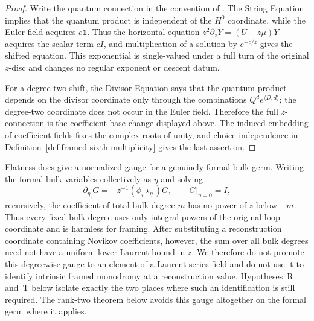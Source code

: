 \begin{proof}
Write the quantum connection in the convention of
\cite[(2.2)--(2.3) and Remark~2.3]{IritaniBlowup}.  The String Equation
implies that the quantum product is independent of the $H^0$ coordinate,
while the Euler field acquires $c\mathbf1$.  Thus the horizontal equation
$z^2\partial_zY=(U-z\mu)Y$ acquires the scalar term $cI$, and multiplication
of a solution by $e^{-c/z}$ gives the shifted equation.  This exponential is
single-valued under a full turn of the original $z$-disc and changes no
regular exponent or descent datum.

For a degree-two shift, the Divisor Equation says that the quantum product
depends on the divisor coordinate only through the combinations
$Q^d e^{\langle D,d\rangle}$; the degree-two coordinate does not occur in
the Euler field.  Therefore the full $z$-connection is the coefficient
base change displayed above.  The induced embedding of coefficient fields
fixes the complex roots of unity, and choice independence in
Definition~\ref{def:framed-sixth-multiplicity} gives the last assertion.
\end{proof}

\begin{remark}
\label{rem:residual-bulk-gap}
Flatness does give a normalized gauge for a genuinely formal bulk germ.
Writing the formal bulk variables collectively as $\eta$ and solving
\[
 \partial_{\eta_i}G=-z^{-1}(\phi_i\star_\eta)G,
 \qquad G|_{\eta=0}=I,
\]
recursively, the coefficient of total bulk degree $m$ has no power of $z$
below $-m$.  Thus every fixed bulk degree uses only integral powers of the
original loop coordinate and is harmless for framing.  After substituting a
reconstruction coordinate containing Novikov coefficients, however, the sum
over all bulk degrees need not have a uniform lower Laurent bound in $z$.
We therefore do not promote this degreewise gauge to an element of a Laurent
series field and do not use it to identify intrinsic framed monodromy at a
reconstruction value.  Hypotheses~R and~T below isolate exactly the two
places where such an identification is still required.  The rank-two theorem
below avoids this gauge altogether on the formal germ where it applies.
\end{remark}

